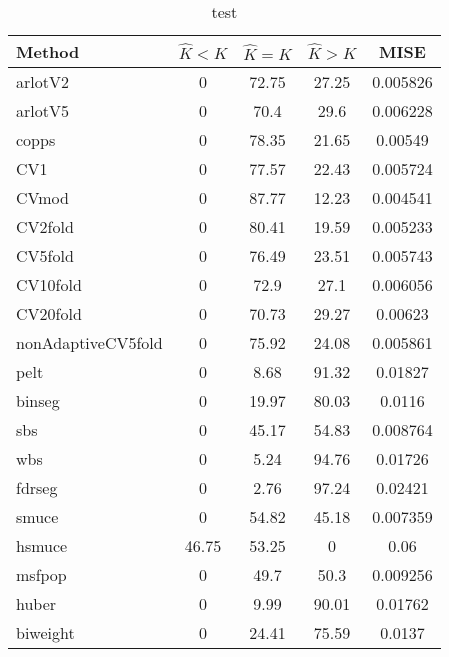 \begin{table}[ht]
\centering
\begin{tabular}{l|cccc}
  \hline
Method & $\hat{K} < K$ & $\hat{K} = K$ & $\hat{K} > K$ & MISE \\ 
  \hline
arlotV2 &     0 & 72.75 & 27.25 & 0.005826 \\ 
  arlotV5 &     0 &  70.4 &  29.6 & 0.006228 \\ 
  copps &     0 & 78.35 & 21.65 & 0.00549 \\ 
  CV1 &     0 & 77.57 & 22.43 & 0.005724 \\ 
  CVmod &     0 & 87.77 & 12.23 & 0.004541 \\ 
  CV2fold &     0 & 80.41 & 19.59 & 0.005233 \\ 
  CV5fold &     0 & 76.49 & 23.51 & 0.005743 \\ 
  CV10fold &     0 &  72.9 &  27.1 & 0.006056 \\ 
  CV20fold &     0 & 70.73 & 29.27 & 0.00623 \\ 
  nonAdaptiveCV5fold &     0 & 75.92 & 24.08 & 0.005861 \\ 
  pelt &     0 &  8.68 & 91.32 & 0.01827 \\ 
  binseg &     0 & 19.97 & 80.03 & 0.0116 \\ 
  sbs &     0 & 45.17 & 54.83 & 0.008764 \\ 
  wbs &     0 &  5.24 & 94.76 & 0.01726 \\ 
  fdrseg &     0 &  2.76 & 97.24 & 0.02421 \\ 
  smuce &     0 & 54.82 & 45.18 & 0.007359 \\ 
  hsmuce & 46.75 & 53.25 &     0 &  0.06 \\ 
  msfpop &     0 &  49.7 &  50.3 & 0.009256 \\ 
  huber &     0 &  9.99 & 90.01 & 0.01762 \\ 
  biweight &     0 & 24.41 & 75.59 & 0.0137 \\ 
   \hline
\end{tabular}
\caption{test} 
\end{table}

